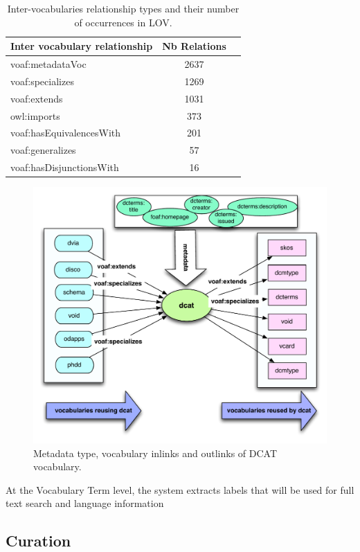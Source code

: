 \documentclass{iosart2c}
\begin{document}
\begin{table}[h!tb]
\caption{Inter-vocabularies relationship types and their number of occurrences in LOV.}
\begin{tabular}{lcc}
\hline
\textbf{Inter vocabulary relationship} & \textbf{Nb Relations} \\ \hline
voaf:metadataVoc & 2637 \\
voaf:specializes & 1269 \\
voaf:extends & 1031 \\
owl:imports & 373 \\
voaf:hasEquivalencesWith & 201 \\
voaf:generalizes & 57 \\
voaf:hasDisjunctionsWith & 16 \\
\hline  
\end{tabular}
\label{tab:voaf}
\end{table}

\begin{figure}[ht!b]
\includegraphics[scale=0.4]{dcat-relations.pdf}
\caption{Metadata type, vocabulary inlinks and outlinks of DCAT vocabulary.}
\label{fig:dcat}
\end{figure}

At the Vocabulary Term level, the system extracts labels that will be used for full text search and language information



\subsection{Curation}
\end{document}
